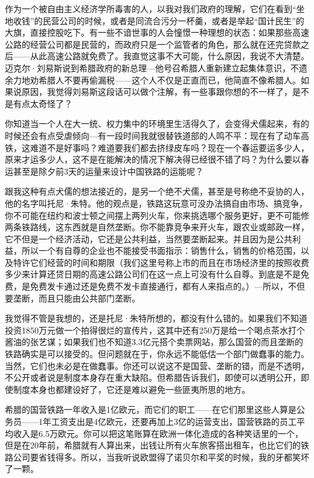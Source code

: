 作为一个被自由主义经济学所毒害的人，以我对我们政府的理解，它们在看到``坐地收钱''的民营公司的时候，或者是同流合污分一杯羹，或者是举起``国计民生''的大旗，直接控股吃下。有一些不谙世事的人会憧憬一种理想的状态：如果那些高速公路的经营公司都是民营的，而政府只是一个监管者的角色，那么就在还完贷款之后------从此高速公路就免费了。我直觉这事不大可能，什么原因，我说不大清楚。迈克尔·刘易斯说到希腊政府的新总理---他号召希腊人重新建立起集体意识，不遗余力地劝希腊人不要再偷漏税------这个人不仅是正直而已，他简直不像希腊人。如果说原因，我觉得刘易斯这段话可以做个注解，有一些事跟你想的不一样了，是不是有点太奇怪了？

你知道当一个人在大一统、权力集中的环境里生活得久了，会变得犬儒起来，有的时候还会有点受虐倾向---有一段时间我就很替铁道部的人鸣不平：现在有了动车高铁，这难道不是好事吗？难道要我们都去挤绿皮车吗？现在一个春运要运多少人，原来才运多少人，这不是在能解决的情况下解决得已经很不错了吗？为什么要以春运甚至是除夕前3天的运量来设计中国铁路的运能呢？

跟我这种有点犬儒的想法接近的，是另一个绝不犬儒，甚至是号称绝不妥协的人，他的名字叫托尼·朱特。他的观点是，铁路这玩意可没办法搞自由市场、搞竞争，你不可能在纽约和波士顿之间摆上两列火车，你来挑选哪个服务更好，更不可能修两条铁路线，这东西就是自然垄断。你不能靠竞争来开火车，跟农业或邮政一样，它不但是一个经济活动，它还是公共利益，当然要垄断起来。并且因为是公共利益，所以一个有自尊的企业也不能接受书面指示：销售什么，销售的价格范围，以及特许它们经营的时间和期限（我们这里号称上市的而且在市场经济里的按照收费多少来计算还贷日期的高速公路公司们在这一点上可没有什么自尊。到底是不是免费，是免费发卡通过还是免费不发卡直接通行，都有人来指点的。）---所以，不但要垄断，而且只能由公共部门垄断。

我觉得不管是我想的，还是托尼·朱特所想的，都没有什么错的。如果我们不知道投资1850万元做一个拍得很烂的宣传片，这其中还有250万是给一个喝点茶水打个酱油的张艺谋；如果我们也不知道3.3亿元搭个卖票网站，那么国营的而且垄断的铁路确实是可以接受的。但问题就在于，你永远不能低估一个部门做蠢事的能力。当然，它们也未必是在做蠢事。你还可以说这不是国营、垄断的错，而是不透明，不公开或者说是制度本身存在重大缺陷。但希腊告诉我们，即使可以透明公开，即使制度本身也都建设好了，它还是难以避免一些匪夷所思的地方。

希腊的国营铁路一年收入是1亿欧元，而它们的职工------在它们那里这些人算是公务员------1年工资支出是4亿欧元，还要再加上3亿的运营支出，国营铁路的员工平均收入是6.5万欧元。你可以把这笔账算在欧洲一体化造成的各种笑话里的一个，但是在20年前，希腊就有人算出来，出钱让所有火车旅客搭出租车，也比它们的铁路公司要省钱得多。所以，当我听说欧盟得了诺贝尔和平奖的时候，我的牙都笑坏了一颗。

